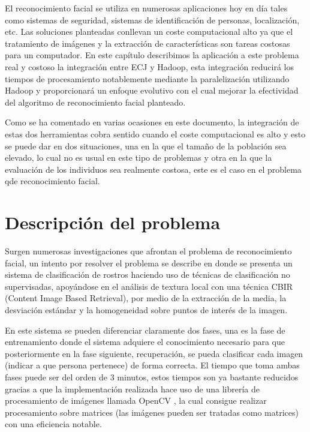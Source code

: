 \label{problema-facerecognition}

El reconocimiento facial se utiliza en numerosas aplicaciones hoy en día tales como sistemas de seguridad, sistemas de identificación de personas, localización, etc. Las soluciones planteadas conllevan un coste computacional alto ya que el tratamiento de imágenes y la extracción de características son tareas costosas para un computador. En este cap\'itulo describimos la aplicación a este problema real y costoso la integración entre ECJ y Hadoop, esta integración reducir\'a los tiempos de procesamiento notablemente mediante la paralelizaci\'on utilizando Hadoop y proporcionar\'a un enfoque evolutivo con el cual mejorar la efectividad del algoritmo de reconocimiento facial planteado.

Como se ha comentado en varias ocasiones en este documento, la integración de estas dos herramientas cobra sentido cuando el coste computacional es alto y esto se puede dar en dos situaciones, una en la que el tama\~no de la población sea elevado, lo cual no es usual en este tipo de problemas y otra en la que la evaluación de los individuos sea realmente costosa, este es el caso en el problema qde reconocimiento facial.

\section{Descripci\'on del problema}

Surgen numerosas investigaciones que afrontan el problema de reconocimiento facial, un intento por resolver el problema se describe en \cite{paper-facerecognition} donde se presenta un sistema de clasificación de rostros haciendo uso de técnicas de clasificaci\'on no supervisadas, apoy\'andose en el an\'alisis de textura local con una t\'ecnica CBIR (Content Image Based Retrieval), por medio de la extracci\'on de la media, la desviaci\'on est\'andar y la homogeneidad sobre puntos de inter\'es de la imagen.

En este sistema se pueden diferenciar claramente dos fases, una es la fase de entrenamiento donde el sistema adquiere el conocimiento necesario para que posteriormente en la fase siguiente, recuperación, se pueda clasificar cada imagen (indicar a que persona pertenece) de forma correcta. El tiempo que toma ambas fases puede ser del orden de 3 minutos, estos tiempos son ya bastante reducidos gracias a que la implementaci\'on realizada hace uso de una librería de procesamiento de im\'agenes llamada OpenCV \cite{opencv}, la cual consigue realizar procesamiento sobre matrices (las imágenes pueden ser tratadas como matrices) con una eficiencia notable.

